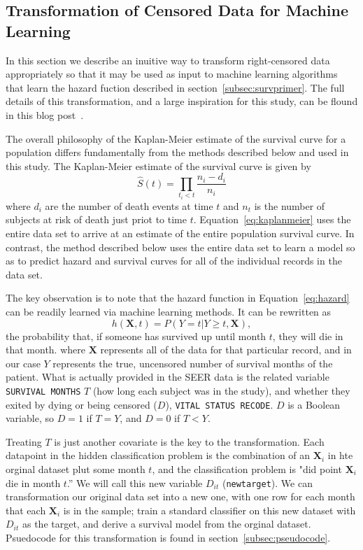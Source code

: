 \documentclass[a4paper,11pt]{article}
\newcommand{\codewhite}[1]{\colorbox{white}{\texttt{#1}}}
\begin{document}
\subsection{Transformation of Censored Data for Machine Learning}
\label{subsec:transformation}

In this section we describe an inuitive way to transform right-censored data appropriately so that it may be used as input to machine learning algorithms that learn the hazard fuction described in section~\ref{subsec:survprimer}. The full details of this transformation, and a large inspiration for this study, can be flound in this blog post~\cite{kuhn}.

The overall philosophy of the Kaplan-Meier estimate of the survival curve for a population differs fundamentally from the methods described below and used in this study. 
The Kaplan-Meier estimate of the survival curve is given by
\begin{equation}
\label{eq:kaplanmeier}
\hat{S}(t) = \prod_{t_i < t} \frac{n_i - d_i}{n_i}
\end{equation}
where $d_i$ are the number of death events at time $t$ and $n_t$ is the number of subjects at risk of death just priot to time $t$. 
Equation~\ref{eq:kaplanmeier} uses the entire data set to arrive at an estimate of the entire population survival curve. In contrast, the method described below uses the entire data set to learn a model so as to predict hazard and survival curves for all of the individual records in the data set.

The key observation is to note that the hazard function in Equation~\ref{eq:hazard} can be readily learned via machine learning methods. It can be rewritten as
\begin{equation}
\label{eq:hhazard}
h(\mathbf{X}, t) = P(Y = t|Y \geq t, \mathbf{X}),
\end{equation}
the probability that, if someone has survived up until month $t$, they will die in that month.
where $\mathbf{X}$ represents all of the data for that particular record, and in our case $Y$ represents the true, uncensored number of survival months of the patient.
What is actually provided in the SEER data is the related variable \codewhite{SURVIVAL MONTHS} $T$ (how long each subject was in the study), and whether they exited by dying or being censored ($D$), \codewhite{VITAL STATUS RECODE}. 
$D$ is a Boolean variable, so $D = 1$ if $T = Y$, and $D = 0$ if $T < Y$.

Treating $T$ is just another covariate is the key to the transformation. Each datapoint in the hidden classification problem is the combination of an $\mathbf{X}_{i}$ in hte orginal dataset plut some month $t$, and the classification problem is "did point $\mathbf{X}_{i}$ die in month $t$.'' We will call this new variable $D_{it}$ (\codewhite{newtarget}).
We can transformation our original data set into a new one, with one row for each month that each $\mathbf{X}_{i}$ is in the sample; train a standard classifier on this new dataset with $D_{it}$ as the target, and derive a survival model from the orginal dataset.
Psuedocode for this transformation is found in section~\ref{subsec:pseudocode}.
\end{document}
